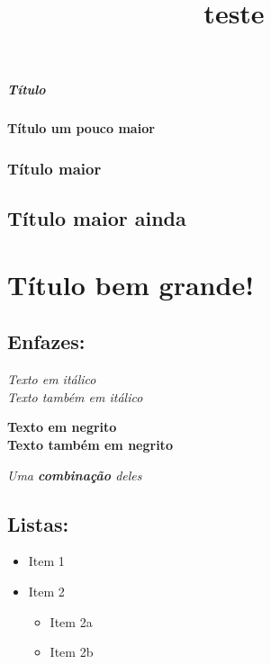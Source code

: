 \documentclass[]{article}
\title{teste}
\author{}
\date{}
\providecommand{\tightlist}{%
  \setlength{\itemsep}{0pt}\setlength{\parskip}{0pt}}
\let\oldparagraph\paragraph
\renewcommand{\paragraph}[1]{\oldparagraph{#1}\mbox{}}
\let\oldsubparagraph\subparagraph
\renewcommand{\subparagraph}[1]{\oldsubparagraph{#1}\mbox{}}
\begin{document}
\maketitle

\subparagraph{Título}\label{titulo}

\paragraph{Título um pouco maior}\label{titulo-um-pouco-maior}

\subsubsection{Título maior}\label{titulo-maior}

\subsection{Título maior ainda}\label{titulo-maior-ainda}

\section{Título bem grande!}\label{titulo-bem-grande}

\subsection{Enfazes:}\label{enfazes}

\emph{Texto em itálico}\\
\emph{Texto também em itálico}

\textbf{Texto em negrito }\\
\textbf{Texto também em negrito}

\emph{Uma \textbf{combinação} deles}

\subsection{Listas:}\label{listas}

\begin{itemize}
\tightlist
\item
  Item 1
\item
  Item 2

  \begin{itemize}
  \tightlist
  \item
    Item 2a
  \item
    Item 2b
  \end{itemize}
\end{itemize}
\end{document}
